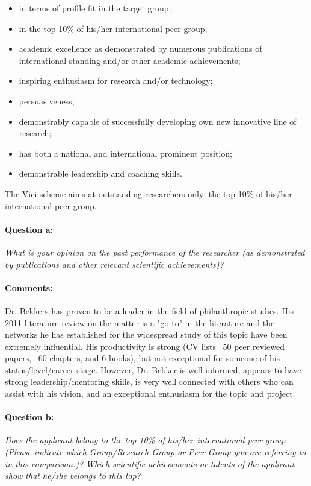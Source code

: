 \documentclass[twocolumn, serif, rga, numeric]{jote-article}
\begin{document}
\begin{itemize}
    \item in terms of profile fit in the target group;
 \item in the top 10\% of his/her international peer group;
 \item academic excellence as demonstrated by numerous publications of international standing and/or other academic achievements;
 \item inspiring enthusiasm for research and/or technology;
 \item persuasiveness;
 \item demonstrably capable of successfully developing own new innovative line of research;
 \item has both a national and international prominent position;
 \item demonstrable leadership and coaching skills.
    \end{itemize}

 The Vici scheme aims at outstanding researchers only: the top 10\% of his/her international peer group.
\paragraph{Question a:}
\textit{What is your opinion on the past performance of the researcher (as demonstrated by publications and other relevant scientific achievements)?}
\paragraph{Comments:}
Dr. Bekkers has proven to be a leader in the field of philanthropic studies. His 2011 literature review on the matter is a "go-to" in the literature and the networks he has established for the widespread study of this topic have been extremely influential. His productivity is strong (CV lists ~50 peer reviewed papers, ~60 chapters, and 6 books), but not exceptional for someone of his status/level/career stage. However, Dr. Bekker is well-informed, appears to have strong leadership/mentoring skills, is very well connected with others who can assist with his vision, and an exceptional enthusiasm for the topic and project.
\paragraph{Question b:}
\textit{Does the applicant belong to the top 10\% of his/her international peer group (Please indicate which Group/Research Group or Peer Group you are referring to in this comparison.)? Which scientific achievements or talents of the applicant show that he/she belongs to this top?}
\end{document}

